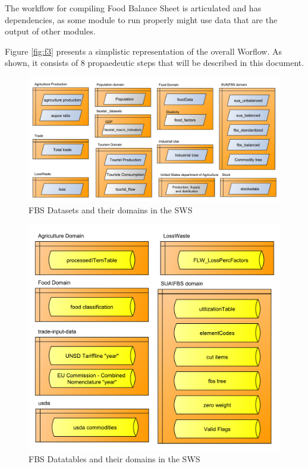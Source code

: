 \documentclass[]{article}
\begin{document}
The workflow for compiling Food Balance Sheet is articulated and has
dependencies, as some module to run properly might use data that are the
output of other modules.

Figure \ref{fig:f3} presents a simplistic representation of the overall
Worflow. As shown, it consists of 8 propaedeutic steps that will be
described in this document.

\begin{figure}[H]

{\centering \includegraphics{images/SwsFbs/02_DatasetsDomains} 

}

\caption{\label{fig:f2}FBS Datasets and their domains in the SWS}\label{fig:f2}
\end{figure}

\begin{figure}[H]

{\centering \includegraphics[width=0.6\linewidth]{images/SwsFbs/04_DataTablesDomains} 

}

\caption{\label{fig:f4}FBS Datatables and their domains in the SWS}\label{fig:f4}
\end{figure}
\end{document}
